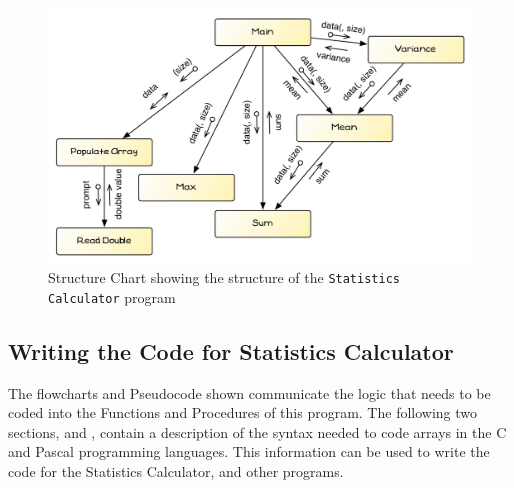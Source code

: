\begin{figure}[htbp]
   \centering
   \includegraphics[width=\textwidth]{./topics/arrays/diagrams/StatsCalcStruct} 
   \caption{Structure Chart showing the structure of the \texttt{Statistics Calculator} program}
   \label{fig:stats-calc-struct}
\end{figure}



\subsection{Writing the Code for Statistics Calculator} %
\label{sub:writing_the_code_for_statistics_calculator}

The flowcharts and Pseudocode shown communicate the logic that needs to be coded into the Functions and Procedures of this program. The following two sections,   and   , contain a description of the syntax needed to code arrays in the C and Pascal programming languages. This information can be used to write the code for the Statistics Calculator, and other programs.

